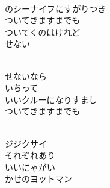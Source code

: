 \documentclass[10pt,b5j]{tarticle} %
\begin{document}
\vspace{1.5em} %
\newcommand{\linespace}{0.5em} %
\newcommand{\blocksize}{0.5\hsize} %
\newcommand{\itemmargin}{3em} %
\begin{enumerate} %
    \setlength{\itemindent}{\itemmargin} %
    \begin{minipage}[c]{\blocksize}
    
        \vspace{\linespace}
        \item~\\
        のシーナイフにすがりつき\\
        ついてきますまでも\\
        ついてくのはけれど\\
        せない
        
    \end{minipage}
    \begin{minipage}[c]{\blocksize}
        
        \vspace{\linespace}
        \item~\\
        せないなら\\
        いちって\\
        いいクルーになりすまし\\
        ついてきますまでも
        
    \end{minipage}
    \begin{minipage}[c]{\blocksize}
        
        \vspace{\linespace}
        \item~\\
        ジジクサイ\\
        それぞれあり\\
        いいにゃがい\\
        かせのヨットマン
        
    \end{minipage}
    \begin{minipage}[c]{\blocksize}
        

\end{minipage}
\end{enumerate}
\end{document}
